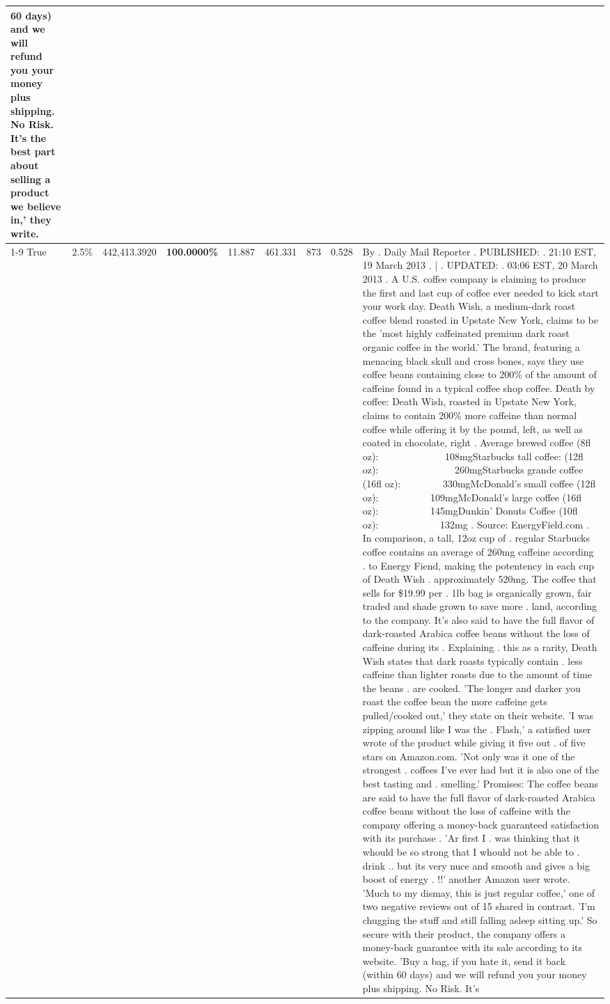 \begin{table}[H]
{\begin{tabular}{lllrlllll}
60 days) and we will refund you your money plus shipping. No Risk. It’s the best part about selling a product we believe in,' they write.

 \\
\cline{1-9}
True & 2.5\% & 442,413.3920 & \bfseries \color{red} 100.0000\% & 11.887 & 461.331 & 873 & 0.528 & By . Daily Mail Reporter . PUBLISHED: . 21:10 EST, 19 March 2013 . | . UPDATED: . 03:06 EST, 20 March 2013 . A U.S. coffee company is claiming to produce the first and last cup of coffee ever needed to kick start your work day. Death Wish, a medium-dark roast coffee blend roasted in Upstate New York, claims to be the 'most highly caffeinated premium dark roast organic coffee in the world.' The brand, featuring a menacing black skull and cross bones, says they use coffee beans containing close to 200\% of the amount of caffeine found in a typical coffee shop coffee. Death by coffee: Death Wish, roasted in Upstate New York, claims to contain 200\% more caffeine than normal coffee while offering it by the pound, left, as well as coated in chocolate, right . Average brewed coffee (8fl oz):              108mgStarbucks tall coffee: (12fl oz):                260mgStarbucks grande coffee (16fl oz):         330mgMcDonald's small coffee (12fl oz):           109mgMcDonald's large coffee (16fl oz):           145mgDunkin' Donuts Coffee (10fl oz):             132mg . Source: EnergyField.com . In comparison, a tall, 12oz cup of . regular Starbucks coffee contains an average of 260mg caffeine according . to Energy Fiend, making the potentency in each cup of Death Wish . approximately 520mg. The coffee that sells for \$19.99 per . 1lb bag is organically grown, fair traded and shade grown to save more . land, according to the company. It's also said to have the full flavor of dark-roasted Arabica coffee beans without the loss of caffeine during its . Explaining . this as a rarity, Death Wish states that dark roasts typically contain . less caffeine than lighter roasts due to the amount of time the beans . are cooked. 'The longer and darker you roast the coffee bean the more caffeine gets pulled/cooked out,' they state on their website. 'I was zipping around like I was the . Flash,' a satisfied user wrote of the product while giving it five out . of five stars on Amazon.com. 'Not only was it one of the strongest . coffees I've ever had but it is also one of the best tasting and . smelling.’ Promises: The coffee beans are said to have the full flavor of dark-roasted Arabica coffee beans without the loss of caffeine with the company offering a money-back guaranteed satisfaction with its purchase . 'Ar first I . was thinking that it whould be so strong that I whould not be able to . drink .. but its very nuce and smooth and gives a big boost of energy . !!' another Amazon user wrote. 'Much to my dismay, this is just regular coffee,' one of two negative reviews out of 15 shared in contrast. 'I'm chugging the stuff and still falling asleep sitting up.' So secure with their product, the company offers a money-back guarantee with its sale according to its website. 'Buy a bag, if you hate it, send it back (within 60 days) and we will refund you your money plus shipping. No Risk. It’s 
\end{tabular}}
\end{table}
